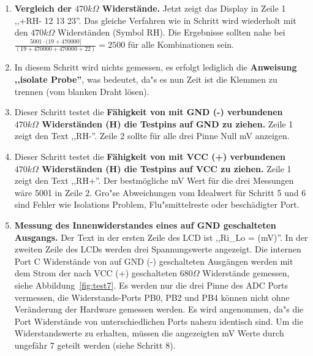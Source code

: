 \begin{enumerate}
\item {\bf Vergleich der \(470k\Omega\) Widerst\"ande.}
Jetzt zeigt das Display in Zeile 1 ,,+RH- 12 13 23''. Das gleiche Verfahren wie in Schritt wird wiederholt mit den
 \(470k\Omega\) Widerst\"anden (Symbol RH).
Die Ergebnisse sollten nahe bei \(\frac{5001 \cdot (19 + 470000]}{ (19 + 470000 + 470000 + 22)} = 2500\) f\"ur alle Kombinationen sein.
\item In diesem Schritt wird nichts gemessen, es erfolgt lediglich die {\bf Anweisung ,,isolate Probe''},
was bedeutet, da"s es nun Zeit ist die Klemmen zu trennen (vom blanken Draht l\"osen).
\item Dieser Schritt testet die {\bf F\"ahigkeit von mit GND (-) verbundenen \(470k\Omega\) Widerst\"anden (H) die Testpins auf GND zu ziehen.}
Zeile 1 zeigt den Text ,,RH-''.
Zeile 2 sollte f\"ur alle drei Pinne  Null mV anzeigen.
\item Dieser Schritt testet die {\bf F\"ahigkeit von mit VCC (+) verbundenen \(470k\Omega\) Widerst\"anden (H) die Testpins auf VCC zu ziehen.}
Zeile 1 zeigt den Text ,,RH+''.
Der bestm\"ogliche mV Wert f\"ur die drei Messungen w\"are 5001 in Zeile 2.
 Gro"se Abweichungen vom Idealwert f\"ur Schritt 5 und 6 sind Fehler wie Isolations Problem, Flu"smittelreste oder besch\"adigter Port.
\item {\bf Messung des Innenwiderstandes eines auf GND geschalteten Ausgangs.}
Der Text in der ersten Zeile des LCD ist ,,Ri\_Lo = (mV)''.
In der zweiten Zeile des LCDs werden drei Spannungswerte angezeigt.
Die internen Port C Widerst\"ande von auf GND (-) geschalteten Ausg\"angen werden mit dem Strom
der nach VCC (+) geschalteten \(680\Omega\) Widerst\"ande gemessen, siehe Abbildung~\ref{fig:test7}.
Es werden nur die drei Pinne des ADC Ports vermessen, die Widerstands-Ports  PB0, PB2 und PB4 k\"onnen nicht
ohne Ver\"anderung der Hardware gemessen werden.
Es wird angenommen, da"s die Port Widerst\"ande von unterschiedlichen Ports nahezu identisch sind.
Um die Widerstandswerte zu erhalten, m\"ussen die angezeigten mV Werte durch ungef\"ahr 7 geteilt werden (siehe Schritt 8).
\begin{figure}[H]
\centering

\end{figure}
\end{enumerate}
